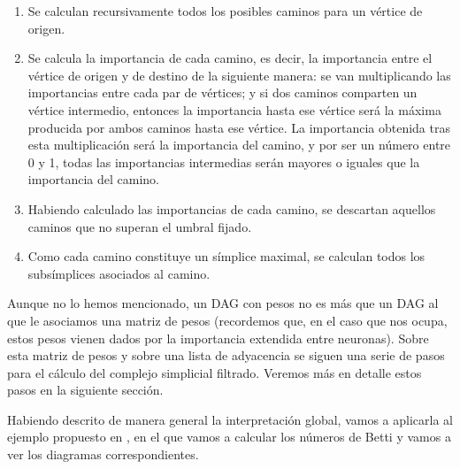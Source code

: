 \documentclass[12pt, a4paper, twoside]{book}
\numberwithin{equation}{section}
\theoremstyle{definition}
\theoremstyle{remark}
\theoremstyle{plain}
\begin{document}
	\begin{enumerate}[label=\arabic*)]
		\item Se calculan recursivamente todos los posibles caminos 
			para un vértice de origen. 
		\item Se calcula la importancia de cada camino, es decir, la 
			importancia entre el vértice de origen y de destino de 
			la siguiente manera: se van multiplicando las 
			importancias entre cada par de vértices; y si dos 
			caminos comparten un vértice intermedio, entonces la 
			importancia hasta ese vértice será la máxima producida 
			por ambos caminos hasta ese vértice. La importancia 
			obtenida tras esta multiplicación será la importancia 
			del camino, y por ser un número entre 0 y 1, todas las
			importancias intermedias serán mayores o iguales que 
			la importancia del camino.
		\item Habiendo calculado las importancias de cada camino, se 
			descartan aquellos caminos que no superan el
			umbral fijado.
		\item Como cada camino constituye un símplice maximal, se 
			calculan todos los subsímplices
			asociados al camino.
	\end{enumerate}

	Aunque no lo hemos mencionado, un DAG con pesos no es más que un DAG
	al que le asociamos una matriz de pesos (recordemos que, en el caso 
	que nos ocupa, estos pesos vienen dados por la importancia extendida 
	entre neuronas). Sobre esta matriz de pesos y sobre una lista de 
	adyacencia se siguen una serie de pasos para el cálculo del complejo 
	simplicial filtrado. Veremos más en detalle estos pasos en la 
	siguiente sección. 

	Habiendo descrito de manera general la interpretación global, vamos a 
	aplicarla al ejemplo propuesto en \cite{Articulo-Watanabe}, en el que 
	vamos a calcular los números de Betti y vamos a ver los diagramas 
	correspondientes.
\end{document}
